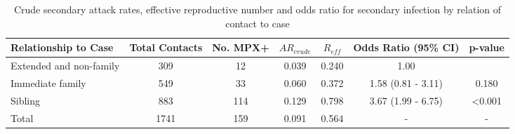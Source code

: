 
\begin{table}
\centering
    \caption{Crude secondary attack rates, effective reproductive number and odds ratio for secondary infection by relation of contact to case}
    \begin{tabular}{@{}lcccccc@{}}
    \toprule
    Relationship to Case & Total Contacts  & No. MPX+ & $AR_{crude}$ & $R_{eff}$ & Odds Ratio (95\% CI)  & p-value \\
    \midrule
  Extended and non-family   &  309   &   12   & 0.039 & 0.240 & 1.00               &  ~ \\
  Immediate family  &  549   &   33   & 0.060 & 0.372 & 1.58 (0.81 - 3.11) & 0.180 \\
  Sibling           &  883   &   114  & 0.129 & 0.798 & 3.67 (1.99 - 6.75) & \textless0.001 \\
  \midrule
  Total             &  1741  &   159  & 0.091 & 0.564 & -                & - \\
    \bottomrule
    \end{tabular}
\end{table}

